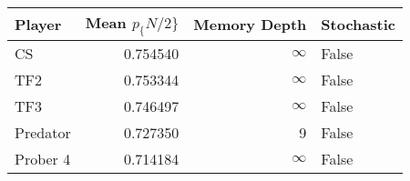\begin{tabular}{lrrl}
\toprule
   Player &  Mean $p_\{N/2\}$ &  Memory Depth & Stochastic \\
\midrule
       CS &        0.754540 &            \(\infty\) &      False \\
      TF2 &        0.753344 &            \(\infty\) &      False \\
      TF3 &        0.746497 &            \(\infty\) &      False \\
 Predator &        0.727350 &             9 &      False \\
 Prober 4 &        0.714184 &            \(\infty\) &      False \\
\bottomrule
\end{tabular}
